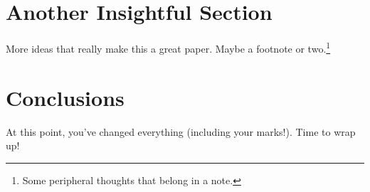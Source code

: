 \documentclass{turabian-researchpaper} %
\begin{document}
    
    \section{Another Insightful Section}
    
    More ideas that really make this a great paper. Maybe a footnote or two.\footnote{Some peripheral thoughts that belong in a note.}
    
    
    \section{Conclusions}
    
    At this point, you've changed everything (including your marks!). Time to wrap up!
    
    
    \clearpage
    \printbibliography
\end{document}
